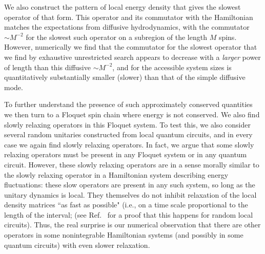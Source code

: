 \documentclass[twocolumn,superscriptaddress, prb]{revtex4-1}
\begin{document}
We also construct the pattern of local energy density that gives the slowest operator of that form.  This operator and its commutator with the Hamiltonian
matches the expectations from diffusive hydrodynamics, with the commutator $\sim M^{-2}$ for the slowest such operator on a subregion of the length $M$ spins.
However, numerically we find that the commutator for the slowest operator that we find by exhaustive unrestricted search appears to decrease with a {\it larger} power of length than this diffusive $\sim M^{-2}$, and for the accessible system sizes is quantitatively substantially smaller (slower) than that of the simple diffusive mode.

To further understand the presence of such approximately conserved quantities we then turn to a Floquet spin chain where energy is not conserved.
We also find slowly relaxing operators in this Floquet system.
To test this, we also consider several random unitaries constructed from local quantum circuits, and in every case we again find slowly relaxing operators.
In fact, we argue that some slowly relaxing operators must be present in any Floquet system or in any quantum circuit.
However, these slowly relaxing operators are in a sense morally similar to the slowly relaxing operator in a Hamiltonian system describing energy fluctuations: these
slow operators are present in any such system, so long as the unitary dynamics is local.  They themselves do not inhibit relaxation of the local density matrices ``as fast as possible" (i.e., on a time scale proportional to the length of the interval;
(see Ref.~ for a proof that this happens for random local circuits).
Thus, the real surprise is our numerical observation that there are other operators in some nonintegrable Hamiltonian systems (and possibly in some quantum circuits) with even slower relaxation.

\end{document}

